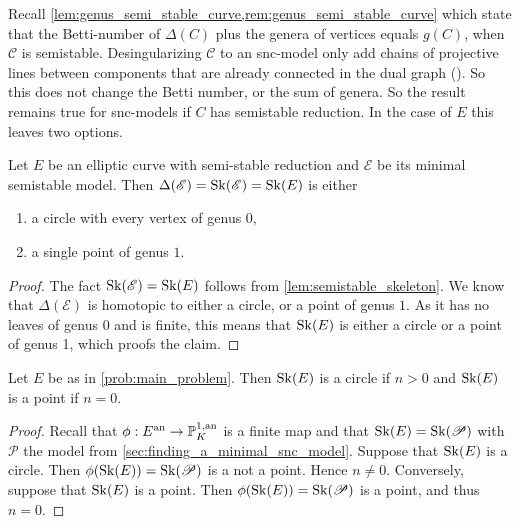 Recall \cref{lem:genus_semi_stable_curve,rem:genus_semi_stable_curve} which state that the Betti-number of $\Delta(C)$ plus the genera of vertices equals $g(C)$, when $\mathscr C$ is semistable.  
Desingularizing $\mathscr C$ to an snc-model only add chains of projective lines between components that are already connected in the dual graph (\cite[cor.\ 10.3.25]{liuAlgebraicGeometryArithmetic2002}). 
So this does not change the Betti number, or the sum of genera. 
So the result remains true for snc-models if $C$ has semistable reduction. 
In the case of $E$ this leaves two options. 
\begin{lemma}\label{lem:point_or_circle}
	Let $E$ be an elliptic curve with semi-stable reduction and $\mathscr E$ be its minimal semistable model. 
	Then $\Delta(\mathscr E) = \operatorname{Sk}(\mathscr E) = \operatorname{Sk}(E)$ is either 
	\begin{enumerate}
		\item a circle with every vertex of genus $0$,
		\item a single point of genus  $1$. 
	\end{enumerate}
\end{lemma}
\begin{proof}
	The fact $\operatorname{Sk}(\mathscr E) = \operatorname{Sk}(E)$ follows from \cref{lem:semistable_skeleton}. 
	We know that $\Delta(\mathscr E)$ is homotopic to either a circle, or a point of genus $1$. 
	As it has no leaves of genus $0$ and is finite, this means that $\operatorname{Sk}(E)$ is either a circle or a point of genus 1, which proofs the claim.
\end{proof}

\begin{lemma}
	Let $E$ be as in \cref{prob:main_problem}. 
	Then $\operatorname{Sk}(E)$ is a circle if $n > 0$ and $\operatorname{Sk}(E)$ is a point if $n = 0$. 
\end{lemma}
\begin{proof}
	Recall that $\phi: E\an \to \pro^{1, \text{an}}_K$ is a finite map and that $\operatorname{Sk}(E) = \operatorname{Sk}(\mathscr P)$ with $\mathscr P$ the model from \cref{sec:finding_a_minimal_snc_model}.
	Suppose that $\operatorname{Sk}(E)$ is a circle. 
	Then $\phi(\sk(E))= \sk(\mathscr P)$ is a not a point. 
	Hence $n \ne 0$. 
	Conversely, suppose that $\operatorname{Sk}(E)$ is a point. 
	Then $\phi(\sk(E)) = \sk(\mathscr P)$ is a point, and thus $n  = 0$. 
\end{proof}

